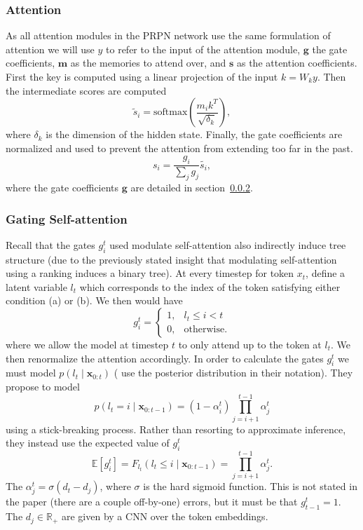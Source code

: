 \documentclass{article}
\newcommand\E[1]{\mathbb{E}\left[#1\right]}
\newcommand{\bx}{\mathbf{x}}
\newcommand{\R}{\mathbb{R}}
\begin{document}
\subsubsection{Attention}
\label{subsec:attn}
As all attention modules in the PRPN network use the same formulation of attention we will use 
$y$ to refer to the input of the attention module, $\bm{g}$ the gate coefficients,
$\bm{m}$ as the memories to attend over, and $\bm{s}$ as the attention coefficients.
First the key is computed using a linear projection of the input $k = W_ky$.
Then the intermediate scores are computed
$$\tilde{s}_i = \textrm{softmax}\left(\frac{m_ik^T}{\sqrt{\delta_k}}\right),$$
where $\delta_k$ is the dimension of the hidden state.
Finally, the gate coefficients are normalized and used to prevent the attention from
extending too far in the past.
$$s_i = \frac{g_i}{\sum_jg_j}\tilde{s_i},$$
where the gate coefficients $\bm{g}$ are detailed in section~\ref{subsec:gates}.

\subsubsection{Gating Self-attention}
\label{subsec:gates}
Recall that the gates $g_i^t$ used modulate self-attention also indirectly induce tree structure
(due to the previously stated insight that modulating self-attention
using a ranking induces a binary tree).
At every timestep for token $x_t$,
\citet{shen2018prpn} define a latent variable $l_t$ which corresponds to the index of the 
token satisfying either condition (a) or (b).
We then would have $$g_i^t = \left\{\begin{array}{lr}
1, & l_t \le i < t\\
0, & \textrm{otherwise.}
\end{array}\right.$$
where we allow the model at timestep $t$ to only attend up to the token at $l_t$.
We then renormalize the attention accordingly.
In order to calculate the gates $g_i^t$ we must model $p(l_t\mid\bx_{0:t})$ 
(\citet{shen2018prpn} use the posterior distribution in their notation).
They propose to model 
$$p(l_t=i\mid\bx_{0:t-1})=(1-\alpha_i^t)\prod_{j=i+1}^{t-1}\alpha_j^t$$
using a stick-breaking process.
Rather than resorting to approximate inference, they instead use the expected value of $g_i^t$
$$\E{g_i^t} = F_{l_t}(l_t \le i\mid\bx_{0:t-1}) = \prod_{j=i+1}^{t-1}\alpha_j^t.$$
The $\alpha_j^t = \sigma(d_t - d_j)$, where $\sigma$ is the hard sigmoid function.
This is not stated in the paper (there are a couple off-by-one) errors,
but it must be that $g_{t-1}^t = 1$.
The $d_j\in\R_+$ are given by a CNN over the token embeddings.
\end{document}

